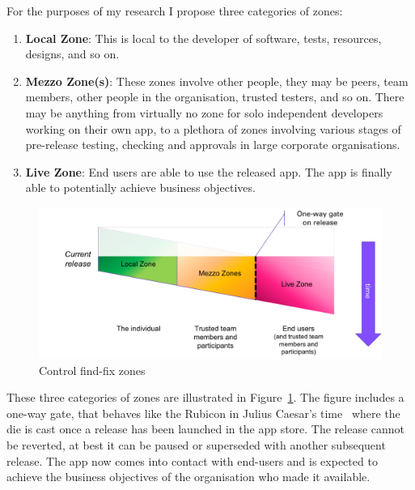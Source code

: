 For the purposes of my research I propose three categories of zones:
\begin{enumerate}
    \item \textbf{Local Zone}: This is local to the developer of software, tests, resources, designs, and so on.
    \item \textbf{Mezzo Zone(s)}: These zones involve other people, they may be peers, team members, other people in the organisation, trusted testers, and so on. There may be anything from virtually no zone for solo independent developers working on their own app, to a plethora of zones involving various stages of pre-release testing, checking and approvals in large corporate organisations.
    \item \textbf{Live Zone}: End users are able to use the released app. The app is finally able to potentially achieve business objectives. 
\end{enumerate}



\begin{figure}
    \includegraphics[width=\linewidth]{images/my/control-find-fix-zones-a.pdf}
    \caption{Control find-fix zones}
    \label{fig:my:control-find-fix-zones-overview}
\end{figure}

These three categories of zones are illustrated in Figure~\ref{fig:my:control-find-fix-zones-overview}. The figure includes a one-way gate, that behaves like the Rubicon in Julius Caesar's time~ where the die is cast once a release has been launched in the app store. The release cannot be reverted, at best it can be paused or superseded with another subsequent release. The app now comes into contact with end-users and is expected to achieve the business objectives of the organisation who made it available.

